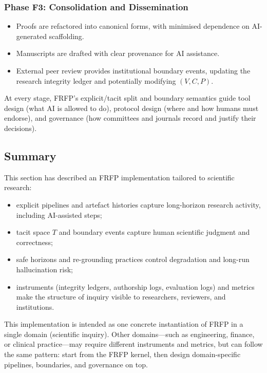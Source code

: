 \subsubsection*{Phase F3: Consolidation and Dissemination}

\begin{itemize}
  \item Proofs are refactored into canonical forms, with minimised dependence
        on AI-generated scaffolding.
  \item Manuscripts are drafted with clear provenance for AI assistance.
  \item External peer review provides institutional boundary events, updating
        the research integrity ledger and potentially modifying $(V, C, P)$.
\end{itemize}

At every stage, FRFP's explicit/tacit split and boundary semantics guide tool
design (what AI is allowed to do), protocol design (where and how humans must
endorse), and governance (how committees and journals record and justify their
decisions).

\subsection{Summary}

This section has described an FRFP implementation tailored to scientific
research:

\begin{itemize}
\item explicit pipelines and artefact histories capture long-horizon research activity, including AI-assisted steps;
  \item tacit space $T$ and boundary events capture human scientific judgment
        and correctness;
  \item safe horizons and re-grounding practices control degradation and
        long-run hallucination risk;
  \item instruments (integrity ledgers, authorship logs, evaluation logs)
        and metrics make the structure of inquiry visible to researchers,
        reviewers, and institutions.
\end{itemize}

This implementation is intended as one concrete instantiation of FRFP in a
single domain (scientific inquiry).
Other domains---such as engineering, finance, or clinical practice---may
require different instruments and metrics, but can follow the same pattern:
start from the FRFP kernel, then design domain-specific pipelines, boundaries,
and governance on top.

